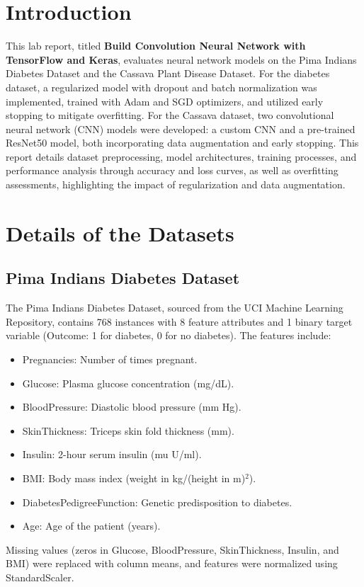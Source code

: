 \documentclass[a4paper,12pt]{article}
\begin{document}
\section*{Introduction}
This lab report, titled \textbf{Build Convolution Neural Network with TensorFlow and Keras}, evaluates neural network models on the Pima Indians Diabetes Dataset and the Cassava Plant Disease Dataset. For the diabetes dataset, a regularized model with dropout and batch normalization was implemented, trained with Adam and SGD optimizers, and utilized early stopping to mitigate overfitting. For the Cassava dataset, two convolutional neural network (CNN) models were developed: a custom CNN and a pre-trained ResNet50 model, both incorporating data augmentation and early stopping. This report details dataset preprocessing, model architectures, training processes, and performance analysis through accuracy and loss curves, as well as overfitting assessments, highlighting the impact of regularization and data augmentation.

\section*{Details of the Datasets}

\subsection*{Pima Indians Diabetes Dataset}
The Pima Indians Diabetes Dataset, sourced from the UCI Machine Learning Repository, contains 768 instances with 8 feature attributes and 1 binary target variable (Outcome: 1 for diabetes, 0 for no diabetes). The features include:
\begin{itemize}
    \item Pregnancies: Number of times pregnant.
    \item Glucose: Plasma glucose concentration (mg/dL).
    \item BloodPressure: Diastolic blood pressure (mm Hg).
    \item SkinThickness: Triceps skin fold thickness (mm).
    \item Insulin: 2-hour serum insulin (mu U/ml).
    \item BMI: Body mass index (weight in kg/(height in m)$^2$).
    \item DiabetesPedigreeFunction: Genetic predisposition to diabetes.
    \item Age: Age of the patient (years).
\end{itemize}
Missing values (zeros in Glucose, BloodPressure, SkinThickness, Insulin, and BMI) were replaced with column means, and features were normalized using StandardScaler.
\end{document}
